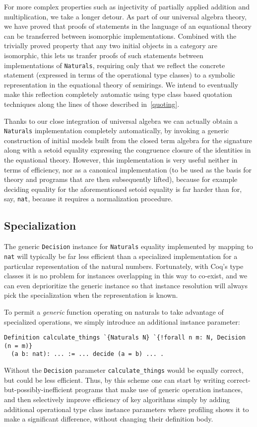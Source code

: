 \documentclass[a4paper,10pt,runningheads]{llncs}
\begin{document}
For more complex properties such as injectivity of partially applied addition and multiplication, we take a longer detour. As part of our universal algebra theory, we have proved that proofs of statements in the language of an equational theory can be transferred between isomorphic implementations. Combined with the trivially proved property that any two initial objects in a category are isomorphic, this lets us tranfer proofs of such statements between implementations of \lstinline|Naturals|, requiring only that we reflect the concrete statement (expressed in terms of the operational type classes) to a symbolic representation in the equational theory of semirings. We intend to eventually make this reflection completely automatic using type class based quotation techniques along the lines of those described in~\ref{quoting}.

Thanks to our close integration of universal algebra we can actually obtain a \lstinline|Naturals| implementation completely automatically, by invoking a generic construction of initial models built from the closed term algebra for the signature along with a setoid equality expressing the congruence closure of the identities in the equational theory. However, this implementation is very useful neither in terms of efficiency, nor as a canonical implementation (to be used as the basis for theory and programs that are then subsequently lifted), because for example deciding equality for the aforementioned setoid equality is far harder than for, say, \lstinline|nat|, because it requires a normalization procedure.


\subsection{Specialization}

The generic \lstinline|Decision| instance for \lstinline|Naturals| equality implemented by mapping to \lstinline|nat| will typically be far less efficient than a specialized implementation for a particular representation of the natural numbers. Fortunately, with Coq's type classes it is no problem for instances overlapping in this way to co-exist, and we can even deprioritize the generic instance so that instance resolution will always pick the specialization when the representation is known.

To permit a \emph{generic} function operating on naturals to take advantage of specialized operations, we simply introduce an additional instance parameter:
\begin{lstlisting}
Definition calculate_things `{Naturals N} `{!forall n m: N, Decision (n = m)}
  (a b: nat): ... := ... decide (a = b) ... .
\end{lstlisting}
Without the \lstinline|Decision| parameter \lstinline|calculate_things| would be equally correct, but could be less efficient. Thus, by this scheme one can start by writing correct-but-possibly-inefficient programs that make use of generic operation instances, and then selectively improve efficiency of key algorithms simply by adding additional operational type class instance parameters where profiling shows it to make a significant difference, without changing their definition body.
\end{document}
